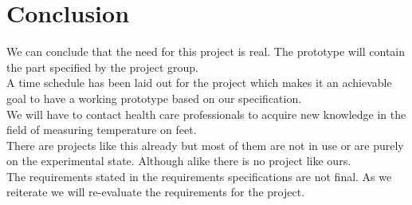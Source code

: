 \chapter{Conclusion}
We can conclude that the need for this project is real. The prototype will contain the part specified by the project group.\\
A time schedule has been laid out for the project which makes it an achievable goal to have a working prototype based on our specification.\\
We will have to contact health care professionals to acquire new knowledge in the field of measuring temperature on feet.\\
There are projects like this already but most of them are not in use or are purely on the experimental state. Although alike there is no project like ours.\\





The requirements stated in the requirements specifications are not final. As we reiterate we will re-evaluate the requirements for the project. 
